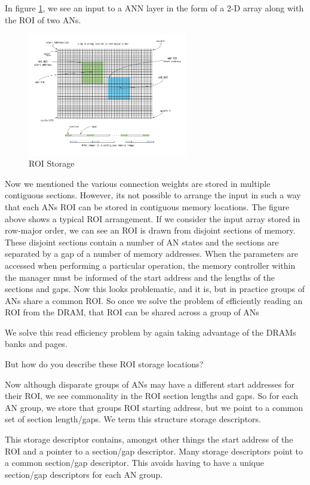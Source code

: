 \documentclass[journal]{IEEEtran}
\begin{document}
In figure \ref{fig:roiStorage}, we see an input to a ANN layer in the form of a 2-D array along with the ROI of two ANs.

\begin{figure}[!t]
\centerline{
\mbox{\includegraphics[width=2.75in]{roiStorage.jpg}}
}
\caption{ROI Storage}
\label{fig:roiStorage}
\end{figure}

Now we mentioned the various connection weights are stored in multiple contiguous sections. However, its not possible to arrange the input in such a way that each ANs ROI can be stored in contiguous memory locations. The figure above shows a typical ROI arrangement. If we consider the input array stored in row-major order, we can see an ROI is drawn from disjoint sections of memory. These disjoint sections contain a number of AN states and the sections are separated by a gap of a number of memory addresses. When the parameters are accessed when performing a particular operation, the memory controller within the manager must be informed of the start address and the lengths of the sections and gaps. Now this looks problematic, and it is, but in practice groups of ANs share a common ROI. So once we solve the problem of efficiently reading an ROI from the DRAM, that ROI can be shared across a group of ANs

We solve this read efficiency problem by again taking advantage of the DRAMs banks and pages.

But how do you describe these ROI storage locations?

Now although disparate groups of ANs may have a different start addresses for their ROI, we see commonality in the ROI section lengths and gaps. So for each AN group, we store that groups ROI starting address, but we point to a common set of section length/gaps. We term this structure storage descriptors.

This storage descriptor contains, amongst other things the start address of the ROI and a pointer to a section/gap descriptor. Many storage descriptors point to a common section/gap descriptor. This avoids having to have a unique section/gap descriptors for each AN group.
\end{document}

